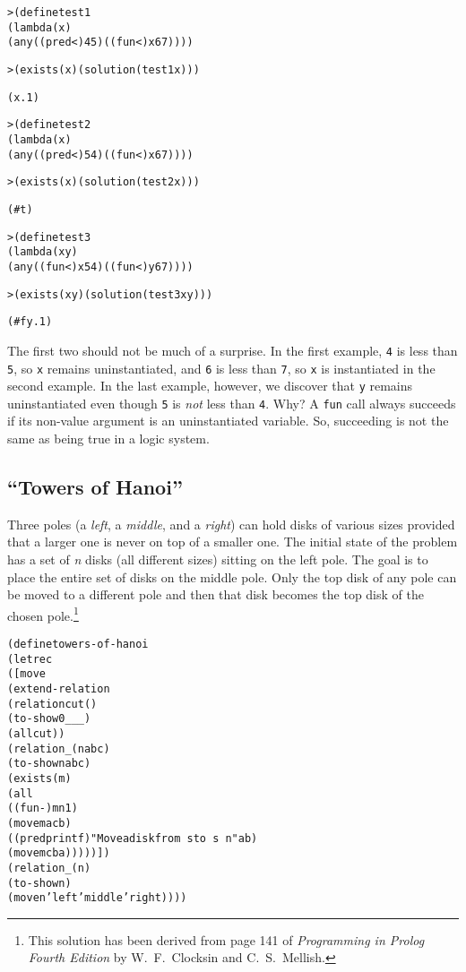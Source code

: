 \begin{alltt}
> (define test1
    (lambda (x)
      (any ((pred <) 4 5) ((fun <) x 6 7))))

> (exists (x) (solution (test1 x)))

(x.1)
\end{alltt}
\begin{alltt}
> (define test2
    (lambda (x)
      (any ((pred <) 5 4) ((fun <) x 6 7))))

> (exists (x) (solution (test2 x)))

(#t)
\end{alltt}
\begin{alltt}
> (define test3
    (lambda (x y)
      (any ((fun <) x 5 4) ((fun <) y 6 7))))

> (exists (x y) (solution (test3 x y)))

(#f y.1)
\end{alltt}

The first two should not be much of a surprise.  In the first example,
\texttt{4} is less than \texttt{5}, so \texttt{x} remains uninstantiated,
and \texttt{6} is less than \texttt{7}, so \texttt{x} is instantiated in
the second example.  In the last example, however, we discover that
\texttt{y} remains uninstantiated even though \texttt{5} is \emph{not} less
than \texttt{4}.  Why? A \texttt{fun} call always succeeds if its non-value
argument is an uninstantiated variable.  So, succeeding is not the same as
being true in a logic system.

\subsection{``Towers of Hanoi''}

Three poles (a \emph{left}, a \emph{middle}, and a \emph{right}) can hold
disks of various sizes provided that a larger one is never on top of a
smaller one.  The initial state of the problem has a set of \emph{n}
disks (all different sizes) sitting on the left pole.  The goal is to
place the entire set of disks on the middle pole.  Only the top disk
of any pole can be moved to a different pole and then that disk
becomes the top disk of the chosen pole.\footnote{This solution has been derived from
page 141 of \emph{Programming in Prolog Fourth Edition} by
W.\ F.\ Clocksin and C.\ S.\ Mellish.}

\begin{alltt}
(define towers-of-hanoi
  (letrec
      ([move
         (extend-relation
           (relation cut ()
             (to-show 0 _ _ _)
             (all cut))
           (relation _ (n a b c)
             (to-show n a b c)
             (exists (m)
               (all
                 ((fun -) m n 1)
                 (move m a c b)
                 ((pred printf) "Move a disk from ~s to ~s~n" a b)
                 (move m c b a)))))])
    (relation _ (n)
      (to-show n)
      (move n 'left 'middle 'right))))
\end{alltt}

